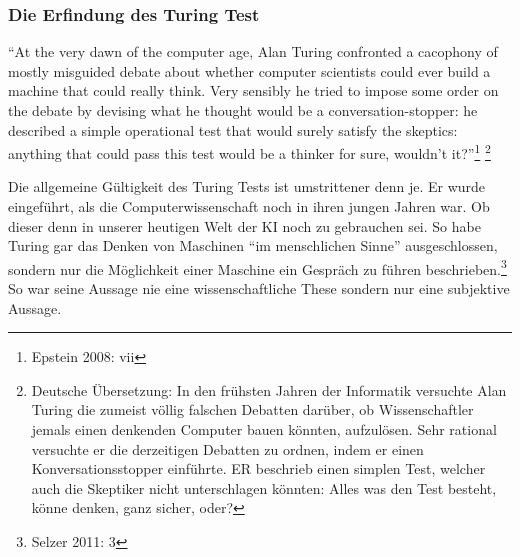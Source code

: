 \documentclass[10pt,a4paper]{article}
\begin{document}
\subsubsection{Die Erfindung des Turing Test}
\begin{displayquote}
\enquote{At the very dawn of the computer age, Alan Turing confronted a cacophony of
mostly misguided debate about whether computer scientists could ever build a
machine that could really think. Very sensibly he tried to impose some order on the
debate by devising what he thought would be a conversation-stopper: he described
a simple operational test that would surely satisfy the skeptics: anything that could
pass this test would be a thinker for sure, wouldn’t it?}\footnote{Epstein 2008: vii} \footnote{Deutsche Übersetzung: In den frühsten Jahren der Informatik versuchte Alan Turing die zumeist völlig falschen Debatten darüber, ob Wissenschaftler jemals einen denkenden Computer bauen könnten, aufzulösen. Sehr rational versuchte er die derzeitigen Debatten zu ordnen, indem er einen Konversationsstopper einführte. ER beschrieb einen simplen Test, welcher auch die Skeptiker nicht unterschlagen könnten: Alles was den Test besteht, könne denken, ganz sicher, oder?}
\end{displayquote}
Die allgemeine Gültigkeit des Turing Tests ist umstrittener denn  je. Er wurde eingeführt, als die Computerwissenschaft noch in ihren jungen Jahren war. Ob dieser denn in unserer heutigen Welt der KI noch zu gebrauchen sei. So habe Turing gar das Denken von Maschinen \enquote{im menschlichen Sinne} ausgeschlossen, sondern nur die Möglichkeit einer Maschine ein Gespräch zu führen beschrieben.\footnote{Selzer 2011: 3} \\
So war seine Aussage nie eine wissenschaftliche These sondern nur eine subjektive Aussage.
\end{document}
